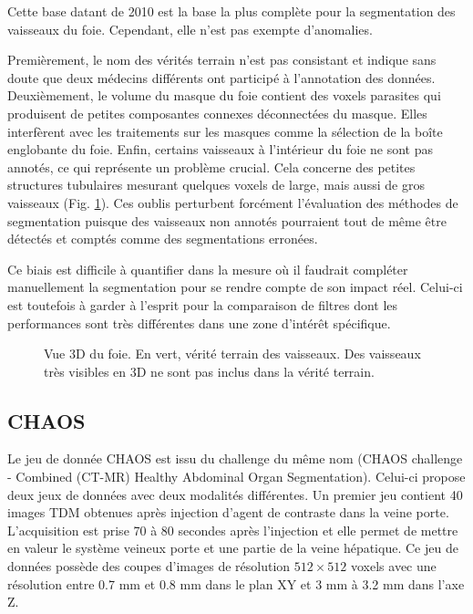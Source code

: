 Cette base datant de 2010 est la base la plus complète pour la segmentation des vaisseaux du foie. Cependant, elle n'est pas exempte d'anomalies. 

Premièrement, le nom des vérités terrain n'est pas consistant et indique sans doute que deux médecins différents ont participé à l'annotation des données. Deuxièmement, le volume du masque du foie contient des voxels parasites qui produisent de petites composantes connexes déconnectées du masque. Elles interfèrent avec les traitements sur les masques comme la sélection de la boîte englobante du foie.
 Enfin, certains vaisseaux à l'intérieur du foie ne sont pas annotés, ce qui représente un problème crucial. Cela concerne des petites structures tubulaires mesurant quelques voxels de large, mais aussi de gros vaisseaux (Fig. \ref{fig:missing_annotations}). Ces oublis perturbent forcément l'évaluation des méthodes de segmentation puisque des vaisseaux non annotés pourraient tout de même être détectés et comptés comme des segmentations erronées. 

Ce biais est difficile à quantifier dans la mesure où il faudrait compléter manuellement la segmentation pour se rendre compte de son impact réel. Celui-ci est toutefois à garder à l'esprit pour la comparaison de filtres dont les performances sont très différentes dans une zone d'intérêt spécifique.
\begin{figure}
    \centering
    \caption{Vue 3D du foie. En vert, vérité terrain des vaisseaux. Des vaisseaux très visibles en 3D ne sont pas inclus dans la vérité terrain.}
    \label{fig:missing_annotations}
\end{figure}
\subsection{CHAOS}
Le jeu de donnée CHAOS est issu du challenge du même nom (CHAOS challenge - Combined (CT-MR) Healthy Abdominal Organ Segmentation). Celui-ci propose deux jeux de données avec deux modalités différentes. Un premier jeu contient 40 images TDM obtenues après injection d'agent de contraste dans la veine porte. L'acquisition est prise 70 à 80 secondes après l'injection et elle permet de mettre en valeur le système veineux porte et une partie de la veine hépatique. Ce jeu de données possède des coupes d'images de résolution $512\times 512$ voxels avec une résolution entre 0.7 mm et 0.8 mm dans le plan XY et 3 mm à 3.2 mm dans l'axe Z.

